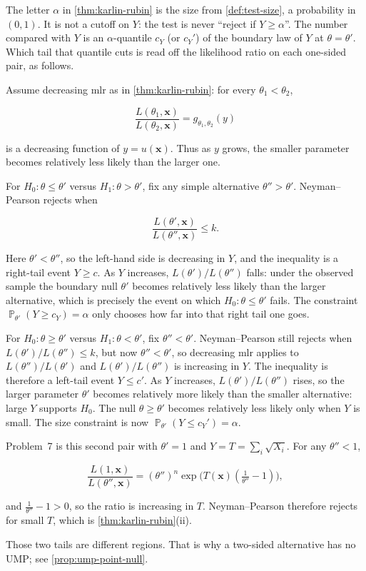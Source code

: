 \documentclass[11pt,a4paper]{article}
\DeclareMathOperator{\Pbb}{\mathbb{P}}
\begin{document}
\begin{remark}
\label{rem:ump-mlr-picture}
The letter \(\alpha\) in \cref{thm:karlin-rubin} is the size from \cref{def:test-size}, a probability in \((0,1)\). It is not a cutoff on \(Y\): the test is never ``reject if \(Y\ge\alpha\)''. The number compared with \(Y\) is an \(\alpha\)-quantile \(c_Y\) (or \(c_Y'\)) of the boundary law of \(Y\) at \(\theta=\theta'\). Which tail that quantile cuts is read off the likelihood ratio on each one-sided pair, as follows.

Assume decreasing mlr as in \cref{thm:karlin-rubin}: for every \(\theta_1<\theta_2\),

\[
\frac{L(\theta_1,\mathbf{x})}{L(\theta_2,\mathbf{x})}
=
g_{\theta_1,\theta_2}(y)
\]

is a decreasing function of \(y=u(\mathbf{x})\). Thus as \(y\) grows, the smaller parameter becomes relatively less likely than the larger one.

For \(H_0:\theta\le\theta'\) versus \(H_1:\theta>\theta'\), fix any simple alternative \(\theta''>\theta'\). Neyman--Pearson rejects when

\[
\frac{L(\theta',\mathbf{x})}{L(\theta'',\mathbf{x})}
\le
k.
\]

Here \(\theta'<\theta''\), so the left-hand side is decreasing in \(Y\), and the inequality is a right-tail event \(Y\ge c\). As \(Y\) increases, \(L(\theta')/L(\theta'')\) falls: under the observed sample the boundary null \(\theta'\) becomes relatively less likely than the larger alternative, which is precisely the event on which \(H_0:\theta\le\theta'\) fails. The constraint \(\Pbb_{\theta'}(Y\ge c_Y)=\alpha\) only chooses how far into that right tail one goes.

For \(H_0:\theta\ge\theta'\) versus \(H_1:\theta<\theta'\), fix \(\theta''<\theta'\). Neyman--Pearson still rejects when \(L(\theta')/L(\theta'')\le k\), but now \(\theta''<\theta'\), so decreasing mlr applies to \(L(\theta'')/L(\theta')\) and \(L(\theta')/L(\theta'')\) is increasing in \(Y\). The inequality is therefore a left-tail event \(Y\le c'\). As \(Y\) increases, \(L(\theta')/L(\theta'')\) rises, so the larger parameter \(\theta'\) becomes relatively more likely than the smaller alternative: large \(Y\) supports \(H_0\). The null \(\theta\ge\theta'\) becomes relatively less likely only when \(Y\) is small. The size constraint is now \(\Pbb_{\theta'}(Y\le c_Y')=\alpha\).

Problem~7 is this second pair with \(\theta'=1\) and \(Y=T=\sum_i\sqrt{X_i}\). For any \(\theta''<1\),

\[
\frac{L(1,\mathbf{x})}{L(\theta'',\mathbf{x})}
=
(\theta'')^{n}
\exp\bigl(T(\mathbf{x})(\tfrac{1}{\theta''}-1)\bigr),
\]

and \(\tfrac{1}{\theta''}-1>0\), so the ratio is increasing in \(T\). Neyman--Pearson therefore rejects for small \(T\), which is \cref{thm:karlin-rubin}(ii).

Those two tails are different regions. That is why a two-sided alternative has no UMP; see \cref{prop:ump-point-null}.
\end{remark}
\end{document}
